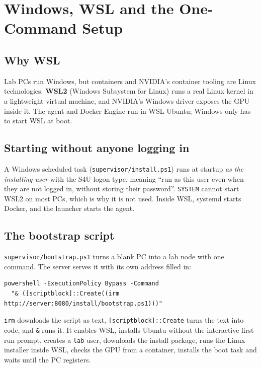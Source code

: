 \section{Windows, WSL and the One-Command Setup}

\subsection{Why WSL}

Lab PCs run Windows, but containers and NVIDIA's container tooling are Linux
technologies. \textbf{WSL2} (Windows Subsystem for Linux) runs a real Linux
kernel in a lightweight virtual machine, and NVIDIA's Windows driver exposes the
GPU inside it. The agent and Docker Engine run in WSL Ubuntu; Windows only has
to start WSL at boot.

\subsection{Starting without anyone logging in}

A Windows scheduled task (\texttt{supervisor/install.ps1}) runs at startup
\emph{as the installing user} with the S4U logon type, meaning ``run as this
user even when they are not logged in, without storing their password''.
\texttt{SYSTEM} cannot start WSL2 on most PCs, which is why it is not used.
Inside WSL, systemd starts Docker, and the launcher starts the agent.

\subsection{The bootstrap script}

\texttt{supervisor/bootstrap.ps1} turns a blank PC into a lab node with one
command. The server serves it with its own address filled in:

\begin{verbatim}
powershell -ExecutionPolicy Bypass -Command
  "& ([scriptblock]::Create((irm http://server:8080/install/bootstrap.ps1)))"
\end{verbatim}

\texttt{irm} downloads the script as text, \texttt{[scriptblock]::Create} turns
the text into code, and \texttt{\&} runs it. It enables WSL, installs Ubuntu
without the interactive first-run prompt, creates a \texttt{lab} user, downloads
the install package, runs the Linux installer inside WSL, checks the GPU from a
container, installs the boot task and waits until the PC registers.

